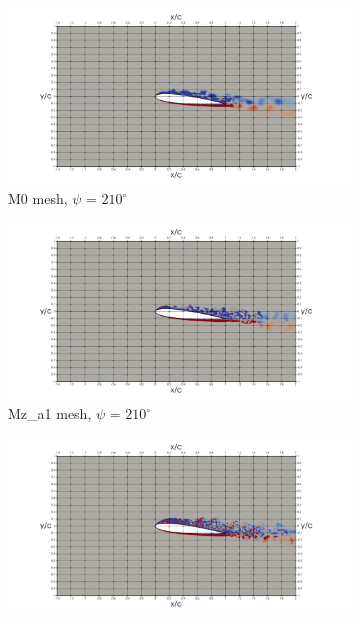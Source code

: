 \begin{figure}[H]
\centering
\begin{subfigure}[b]{0.475\textwidth}
\centering
\includegraphics[width=1.25\textwidth]{figures/vorticity_plots/M0/ph_210.png}
\caption{M0 mesh, $\psi$ = $210^\circ$}
\label{fig:M0_psi210}
\end{subfigure}
\begin{subfigure}[b]{0.475\textwidth}
\centering
\includegraphics[width=1.25\textwidth]{figures/vorticity_plots/Mza1/ph_210.png}
\caption{Mz\_a1 mesh, $\psi$ = $210^\circ$}
\label{fig:Ma1_psi210}
\end{subfigure}
\begin{subfigure}[b]{0.475\textwidth}
\centering
\includegraphics[width=1.25\textwidth]{figures/vorticity_plots/Mza2/ph_210.png}

\end{subfigure}
\end{figure}
